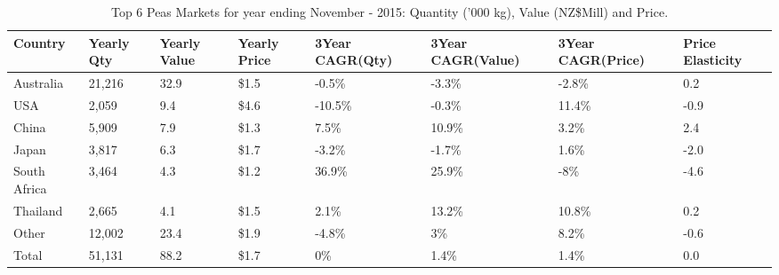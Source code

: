 \begin{table}[ht]
\centering
{\scriptsize
\begin{tabular}[t]{p{1.8cm}>{\hfill}p{1.4cm}>{\hfill}p{1.4cm}>{\hfill}p{1.6cm}>{\hfill}p{1.9cm}>{\hfill}p{2cm}>{\hfill}p{1.9cm}>{\hfill}p{1.5cm}}
 \textbf{Country} & \textbf{Yearly Qty} & \textbf{Yearly Value} & \textbf{Yearly Price} & \textbf{3Year CAGR(Qty)} & \textbf{3Year CAGR(Value)} & \textbf{3Year CAGR(Price)} & \textbf{Price Elasticity} \\
\hline
Australia & 21,216 & 32.9 & \$1.5 & -0.5\% & -3.3\% & -2.8\% & 0.2 \\  
USA & 2,059 & 9.4 & \$4.6 & -10.5\% & -0.3\% & 11.4\% & -0.9 \\  
China & 5,909 & 7.9 & \$1.3 & 7.5\% & 10.9\% & 3.2\% & 2.4 \\  
Japan & 3,817 & 6.3 & \$1.7 & -3.2\% & -1.7\% & 1.6\% & -2.0 \\  
South Africa & 3,464 & 4.3 & \$1.2 & 36.9\% & 25.9\% & -8\% & -4.6 \\  
Thailand & 2,665 & 4.1 & \$1.5 & 2.1\% & 13.2\% & 10.8\% & 0.2 \\  
Other & 12,002 & 23.4 & \$1.9 & -4.8\% & 3\% & 8.2\% & -0.6 \\  
Total & 51,131 & 88.2 & \$1.7 & 0\% & 1.4\% & 1.4\% & 0.0 \\  
\hline
\end{tabular}
}
\caption{\scriptsize Top 6 Peas Markets for year ending November - 2015: Quantity ('000 kg), Value (NZ\$Mill) and Price.}
\end{table}


